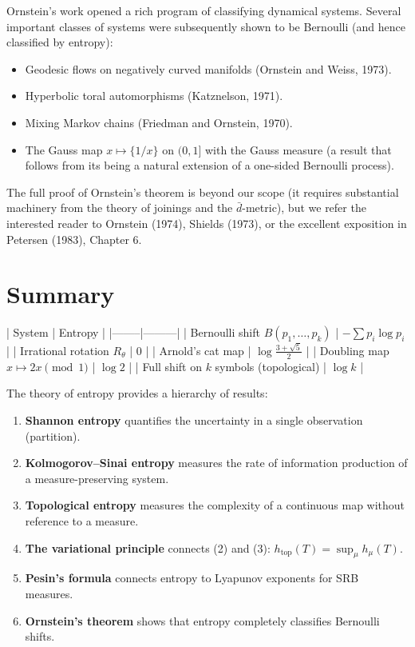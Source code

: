 Ornstein's work opened a rich program of classifying dynamical systems. Several important classes of systems were subsequently shown to be Bernoulli (and hence classified by entropy):

\begin{itemize}[nosep]
  \item Geodesic flows on negatively curved manifolds (Ornstein and Weiss, 1973).
  \item Hyperbolic toral automorphisms (Katznelson, 1971).
  \item Mixing Markov chains (Friedman and Ornstein, 1970).
  \item The Gauss map $x \mapsto \{1/x\}$ on $(0,1]$ with the Gauss measure (a result that follows from its being a natural extension of a one-sided Bernoulli process).
\end{itemize}

The full proof of Ornstein's theorem is beyond our scope (it requires substantial machinery from the theory of joinings and the $\bar{d}$-metric), but we refer the interested reader to Ornstein (1974), Shields (1973), or the excellent exposition in Petersen (1983), Chapter 6.


\bigskip


\section{Summary}\label{sec:11.11}

| System | Entropy |
|--------|---------|
| Bernoulli shift $B(p_1, \ldots, p_k)$ | $-\sum p_i \log p_i$ |
| Irrational rotation $R_\theta$ | $0$ |
| Arnold's cat map | $\log\frac{3+\sqrt{5}}{2}$ |
| Doubling map $x \mapsto 2x \pmod 1$ | $\log 2$ |
| Full shift on $k$ symbols (topological) | $\log k$ |

The theory of entropy provides a hierarchy of results:

\begin{enumerate}[nosep]
  \item \textbf{Shannon entropy} quantifies the uncertainty in a single observation (partition).
  \item \textbf{Kolmogorov--Sinai entropy} measures the rate of information production of a measure-preserving system.
  \item \textbf{Topological entropy} measures the complexity of a continuous map without reference to a measure.
  \item \textbf{The variational principle} connects (2) and (3): $h_{\mathrm{top}}(T) = \sup_\mu h_\mu(T)$.
  \item \textbf{Pesin's formula} connects entropy to Lyapunov exponents for SRB measures.
  \item \textbf{Ornstein's theorem} shows that entropy completely classifies Bernoulli shifts.


\bigskip

\end{enumerate}

